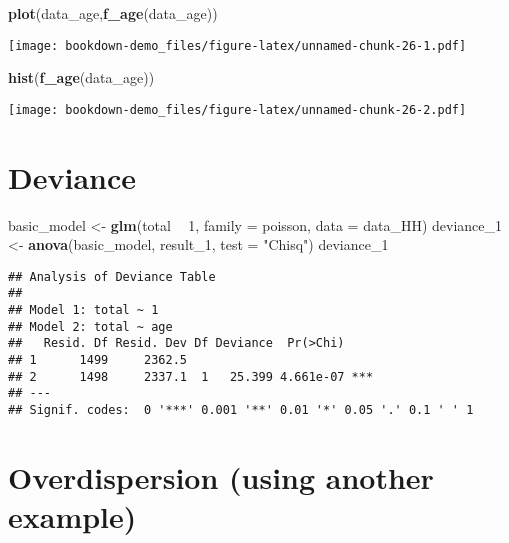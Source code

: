 \documentclass[]{book}
\newenvironment{Shaded}{\begin{snugshade}}{\end{snugshade}}
\newcommand{\DataTypeTok}[1]{\textcolor[rgb]{0.13,0.29,0.53}{#1}}
\newcommand{\DecValTok}[1]{\textcolor[rgb]{0.00,0.00,0.81}{#1}}
\newcommand{\KeywordTok}[1]{\textcolor[rgb]{0.13,0.29,0.53}{\textbf{#1}}}
\newcommand{\NormalTok}[1]{#1}
\newcommand{\OperatorTok}[1]{\textcolor[rgb]{0.81,0.36,0.00}{\textbf{#1}}}
\newcommand{\StringTok}[1]{\textcolor[rgb]{0.31,0.60,0.02}{#1}}
\begin{document}
\begin{Shaded}
\begin{Highlighting}[]
\KeywordTok{plot}\NormalTok{(data_age,}\KeywordTok{f_age}\NormalTok{(data_age))}
\end{Highlighting}
\end{Shaded}

\texttt{[image: bookdown-demo\_files/figure-latex/unnamed-chunk-26-1.pdf]}

\begin{Shaded}
\begin{Highlighting}[]
\KeywordTok{hist}\NormalTok{(}\KeywordTok{f_age}\NormalTok{(data_age))}
\end{Highlighting}
\end{Shaded}

\texttt{[image: bookdown-demo\_files/figure-latex/unnamed-chunk-26-2.pdf]}

\hypertarget{deviance}{%
\section{Deviance}\label{deviance}}

\begin{Shaded}
\begin{Highlighting}[]
\NormalTok{basic_model <-}\StringTok{ }\KeywordTok{glm}\NormalTok{(total }\OperatorTok{~}\StringTok{ }\DecValTok{1}\NormalTok{, }\DataTypeTok{family =}\NormalTok{ poisson, }\DataTypeTok{data =}\NormalTok{ data_HH)}
\NormalTok{deviance_}\DecValTok{1}\NormalTok{ <-}\StringTok{ }\KeywordTok{anova}\NormalTok{(basic_model, result_}\DecValTok{1}\NormalTok{, }\DataTypeTok{test =} \StringTok{"Chisq"}\NormalTok{)}
\NormalTok{deviance_}\DecValTok{1}
\end{Highlighting}
\end{Shaded}

\begin{verbatim}
## Analysis of Deviance Table
## 
## Model 1: total ~ 1
## Model 2: total ~ age
##   Resid. Df Resid. Dev Df Deviance  Pr(>Chi)    
## 1      1499     2362.5                          
## 2      1498     2337.1  1   25.399 4.661e-07 ***
## ---
## Signif. codes:  0 '***' 0.001 '**' 0.01 '*' 0.05 '.' 0.1 ' ' 1
\end{verbatim}

\hypertarget{overdispersion-using-another-example}{%
\section{Overdispersion (using another example)}\label{overdispersion-using-another-example}}
\end{document}
